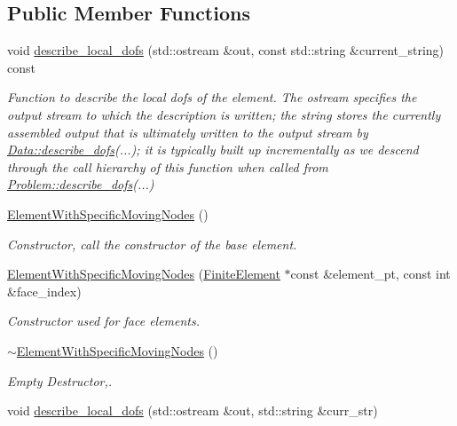 \subsection*{Public Member Functions}
\begin{DoxyCompactItemize}
\item 
void \hyperlink{classoomph_1_1ElementWithSpecificMovingNodes_abbcb617eac0cb1d5763fae6ff81cb154}{describe\+\_\+local\+\_\+dofs} (std\+::ostream \&out, const std\+::string \&current\+\_\+string) const
\begin{DoxyCompactList}\small\item\em Function to describe the local dofs of the element. The ostream specifies the output stream to which the description is written; the string stores the currently assembled output that is ultimately written to the output stream by \hyperlink{classoomph_1_1Data_a2dae16e2dcff9a40029f834c83364df5}{Data\+::describe\+\_\+dofs}(...); it is typically built up incrementally as we descend through the call hierarchy of this function when called from \hyperlink{classoomph_1_1Problem_abc103804eb319ae0b3d43870cc3e1eaf}{Problem\+::describe\+\_\+dofs}(...) \end{DoxyCompactList}\item 
\hyperlink{classoomph_1_1ElementWithSpecificMovingNodes_ab1be9f676f0ba2b545da3573015cfe69}{Element\+With\+Specific\+Moving\+Nodes} ()
\begin{DoxyCompactList}\small\item\em Constructor, call the constructor of the base element. \end{DoxyCompactList}\item 
\hyperlink{classoomph_1_1ElementWithSpecificMovingNodes_a26d26c4b88c457b65bce492a23f7ad99}{Element\+With\+Specific\+Moving\+Nodes} (\hyperlink{classoomph_1_1FiniteElement}{Finite\+Element} $\ast$const \&element\+\_\+pt, const int \&face\+\_\+index)
\begin{DoxyCompactList}\small\item\em Constructor used for face elements. \end{DoxyCompactList}\item 
\hyperlink{classoomph_1_1ElementWithSpecificMovingNodes_a923a9f53ff6354798982ca8830bad824}{$\sim$\+Element\+With\+Specific\+Moving\+Nodes} ()
\begin{DoxyCompactList}\small\item\em Empty Destructor,. \end{DoxyCompactList}\item 
void \hyperlink{classoomph_1_1ElementWithSpecificMovingNodes_a8f67562d3b274bb2f4f8926c4c9a186d}{describe\+\_\+local\+\_\+dofs} (std\+::ostream \&out, std\+::string \&curr\+\_\+str)

\end{DoxyCompactItemize}
